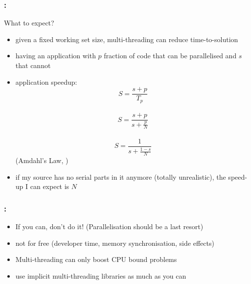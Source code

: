 \documentclass[9pt,xcolor=table]{beamer}
\begin{document}
\begin{frame}
\frametitle{\insertsectionhead{}: \insertsubsectionhead{}}
\begin{block}{What to expect?}
  \begin{itemize}
  \item given a fixed working set size, multi-threading can reduce time-to-solution
  \item having an application with $p$ fraction of code that can be parallelised and $s$ that cannot
  \item application speedup:\\
    $$ S = \frac{s+p}{T_p} $$\\
    $$ S = \frac{s+p}{s+\frac{p}{N}}$$\\
    $$ S = \frac{1}{s + \frac{1-s}{N}}$$ (Amdahl's Law, \cite{AmdahlsArgument})
  \item if my source has no serial parts in it anymore (totally unrealistic), the speed-up I can expect is $N$
  \end{itemize}
\end{block}
\end{frame}

\begin{frame}
\frametitle{\insertsectionhead{}: \insertsubsectionhead{}}
\large
\begin{itemize}
\item \alert{If you can, don't do it!} (Parallelisation should be a last resort)
\item not for free (developer time, memory synchronisation, side effects)
\item Multi-threading can only boost CPU bound problems
\item use implicit multi-threading libraries as much as you can
\end{itemize}
\end{frame}
\end{document}
